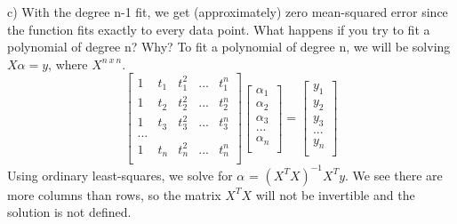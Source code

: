 \documentclass[11pt]{article}
\newenvironment{problem}[2][Problem]{\begin{trivlist}
\item[\hskip \labelsep {\bfseries #1}\hskip \labelsep {\bfseries #2.}]}{\end{trivlist}}
\begin{document}
\begin{problem}{2.1}
(c) 
With the degree n-1 fit, we get (approximately) zero mean-squared error since the function fits exactly to every data point. What happens if you try to fit a polynomial of degree n? Why? To fit a polynomial of degree n, we will be solving $X\alpha = y$, where $X^{n~x~n}$.
\[
	\begin{bmatrix}
	1 & t_{1} & t^2_{1} & ... & t^n_{1}\\
	1 & t_{2} & t^2_{2} & ... & t^n_{2}\\
	1 & t_{3} & t^2_{3} & ... & t^n_{3}\\
	...\\
	1 & t_{n} & t^2_{n} & ... & t^n_{n}\\
	\end{bmatrix}
	\begin{bmatrix}
		\alpha_{1}\\
		\alpha_{2}\\
		\alpha_{3}\\
		...\\
		\alpha_{n}\\
	 \end{bmatrix}
=
	\begin{bmatrix}
		y_{1}\\
		y_{2}\\
		y_{3}\\
		...\\
		y_{n}\\
	 \end{bmatrix}
\]
Using ordinary least-squares, we solve for $\alpha$ = $(X^{T}X)^{-1}X^{T}y$. We see there are more columns than rows, so the matrix $X^{T}X$ will not be invertible and the solution is not defined. 


\end{problem}
\end{document}
